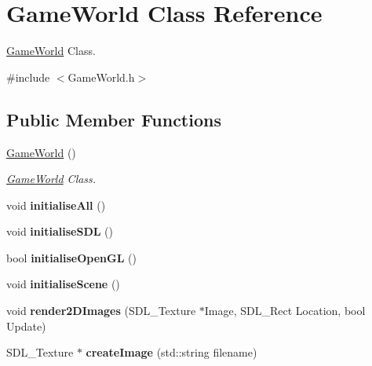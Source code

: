 \hypertarget{class_game_world}{\section{Game\+World Class Reference}
\label{class_game_world}
}


\hyperlink{class_game_world}{Game\+World} Class.  




{\ttfamily \#include $<$Game\+World.\+h$>$}

\subsection*{Public Member Functions}
\begin{DoxyCompactItemize}
\item 
\hyperlink{class_game_world_a681994123c12833d43c957d6cfb33765}{Game\+World} ()
\begin{DoxyCompactList}\small\item\em \hyperlink{class_game_world}{Game\+World} Class. \end{DoxyCompactList}\item 
\hypertarget{class_game_world_ae3f6a182914b5ce974ca9d29c3e9754f}{void {\bfseries initialise\+All} ()}\label{class_game_world_ae3f6a182914b5ce974ca9d29c3e9754f}

\item 
\hypertarget{class_game_world_ab12441eece6fb067336dff5ea7e8cf9f}{void {\bfseries initialise\+S\+D\+L} ()}\label{class_game_world_ab12441eece6fb067336dff5ea7e8cf9f}

\item 
\hypertarget{class_game_world_a0133ddd3bc09df3e50bfa55b669544be}{bool {\bfseries initialise\+Open\+G\+L} ()}\label{class_game_world_a0133ddd3bc09df3e50bfa55b669544be}

\item 
\hypertarget{class_game_world_a1b41038028143546cb68f9b1a23b2dda}{void {\bfseries initialise\+Scene} ()}\label{class_game_world_a1b41038028143546cb68f9b1a23b2dda}

\item 
\hypertarget{class_game_world_aa11069ac7e6d05164f4dcf2f93593b36}{void {\bfseries render2\+D\+Images} (S\+D\+L\+\_\+\+Texture $\ast$Image, S\+D\+L\+\_\+\+Rect Location, bool Update)}\label{class_game_world_aa11069ac7e6d05164f4dcf2f93593b36}

\item 
\hypertarget{class_game_world_a0a066cb6a7d2a3975a7cdeb643a2d14d}{S\+D\+L\+\_\+\+Texture $\ast$ {\bfseries create\+Image} (std\+::string filename)}\label{class_game_world_a0a066cb6a7d2a3975a7cdeb643a2d14d}


\end{DoxyCompactItemize}

